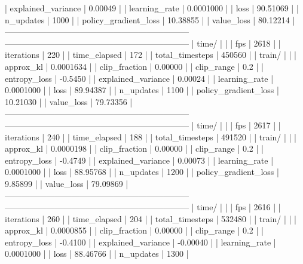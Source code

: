|    explained_variance   |      0.00049 |
|    learning_rate        |    0.0001000 |
|    loss                 |     90.51069 |
|    n_updates            |         1000 |
|    policy_gradient_loss |     10.38855 |
|    value_loss           |     80.12214 |
------------------------------------------------------------------
------------------------------------------------------------------
| time/                   |              |
|    fps                  |         2618 |
|    iterations           |          220 |
|    time_elapsed         |          172 |
|    total_timesteps      |       450560 |
| train/                  |              |
|    approx_kl            |    0.0001634 |
|    clip_fraction        |      0.00000 |
|    clip_range           |          0.2 |
|    entropy_loss         |      -0.5450 |
|    explained_variance   |      0.00024 |
|    learning_rate        |    0.0001000 |
|    loss                 |     89.94387 |
|    n_updates            |         1100 |
|    policy_gradient_loss |     10.21030 |
|    value_loss           |     79.73356 |
------------------------------------------------------------------
------------------------------------------------------------------
| time/                   |              |
|    fps                  |         2617 |
|    iterations           |          240 |
|    time_elapsed         |          188 |
|    total_timesteps      |       491520 |
| train/                  |              |
|    approx_kl            |    0.0000198 |
|    clip_fraction        |      0.00000 |
|    clip_range           |          0.2 |
|    entropy_loss         |      -0.4749 |
|    explained_variance   |      0.00073 |
|    learning_rate        |    0.0001000 |
|    loss                 |     88.95768 |
|    n_updates            |         1200 |
|    policy_gradient_loss |      9.85899 |
|    value_loss           |     79.09869 |
------------------------------------------------------------------
------------------------------------------------------------------
| time/                   |              |
|    fps                  |         2616 |
|    iterations           |          260 |
|    time_elapsed         |          204 |
|    total_timesteps      |       532480 |
| train/                  |              |
|    approx_kl            |    0.0000855 |
|    clip_fraction        |      0.00000 |
|    clip_range           |          0.2 |
|    entropy_loss         |      -0.4100 |
|    explained_variance   |     -0.00040 |
|    learning_rate        |    0.0001000 |
|    loss                 |     88.46766 |
|    n_updates            |         1300 |
